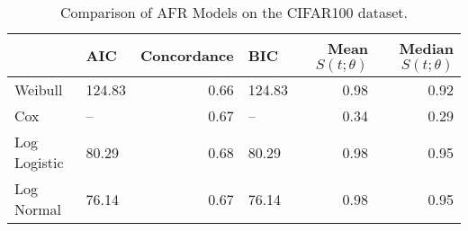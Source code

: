 \begin{table*}\n\centering
\caption{Comparison of AFR Models on the CIFAR100 dataset.}
\label{tab:cifar100}
\begin{tabular}{llrlrr}
\toprule
 & AIC & Concordance & BIC & Mean $S(t;\theta)$ & Median $S(t; \theta)$ \\
\midrule
Weibull & 124.83 & 0.66 & 124.83 & 0.98 & 0.92 \\
Cox & -- & 0.67 & -- & 0.34 & 0.29 \\
Log Logistic & 80.29 & 0.68 & 80.29 & 0.98 & 0.95 \\
Log Normal & 76.14 & 0.67 & 76.14 & 0.98 & 0.95 \\
\bottomrule
\end{tabular}
\end{table*}
